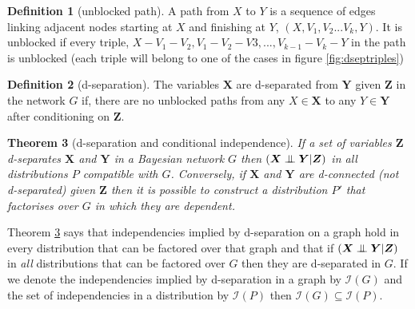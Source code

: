 \documentclass[11pt,a4paper,oneside]{book}
\newcommand{\indep}[1]{\mathcal{I}\left(#1\right)}
\theoremstyle{plain}
\newtheorem{theorem}{Theorem}
\theoremstyle{definition}
\newtheorem{definition}[theorem]{Definition}
\newcommand{\ci}{\mathrel{\perp\mspace{-10mu}\perp}}
\begin{document}
\vspace{.3cm}
\begin{definition}[unblocked path]
\label{def:unblocked}
A path from $X$ to $Y$ is a sequence of edges linking adjacent nodes starting at $X$ and finishing at $Y$,  $(X,V_{1},V_{2}...V_{k},Y)$. It is unblocked if every triple, $X-V_{1}-V_{2},V_{1}-V_{2}-V{3},...,V_{k-1}-V_{k}-Y$ in the path is unblocked (each triple will belong to one of the cases in figure \ref{fig:dseptriples})
\end{definition}

\vspace{.3cm}
\begin{definition}[d-separation]
\label{def:dsep}
The variables $\boldsymbol{X}$ are d-separated from $\boldsymbol{Y}$ given $\boldsymbol{Z}$ in the network $G$ if, there are no unblocked paths from any $X \in \boldsymbol{X}$ to any $Y \in \boldsymbol{Y}$ after conditioning on $\boldsymbol{Z}$. 
\end{definition}

\vspace{.3cm}
\begin{theorem}[d-separation and conditional independence]
\label{thrm:dsep_independence}
If a set of variables $\boldsymbol{Z}$ d-separates $\boldsymbol{X}$ and $\boldsymbol{Y}$ in a Bayesian network $G$ then ${(\boldsymbol{X} \ci \boldsymbol{Y}|\boldsymbol{Z})}$ in all distributions $P$ compatible with $G$. Conversely, if $\boldsymbol{X}$ and $\boldsymbol{Y}$ are d-connected (not d-separated) given $\boldsymbol{Z}$ then it is possible to construct a distribution $P'$ that factorises over $G$ in which they are dependent. 
\end{theorem}

Theorem \ref{thrm:dsep_independence} says that independencies implied by d-separation on a graph hold in every distribution that can be factored over that graph and that if ${(\boldsymbol{X} \ci \boldsymbol{Y}|\boldsymbol{Z})}$ in \emph{all} distributions that can be factored over $G$ then they are d-separated in $G$. If we denote the independencies implied by d-separation in a graph by $\indep{G}$ and the set of independencies in a distribution by $\indep{P}$ then $\indep{G} \subseteq \indep{P}$. 
\end{document}
